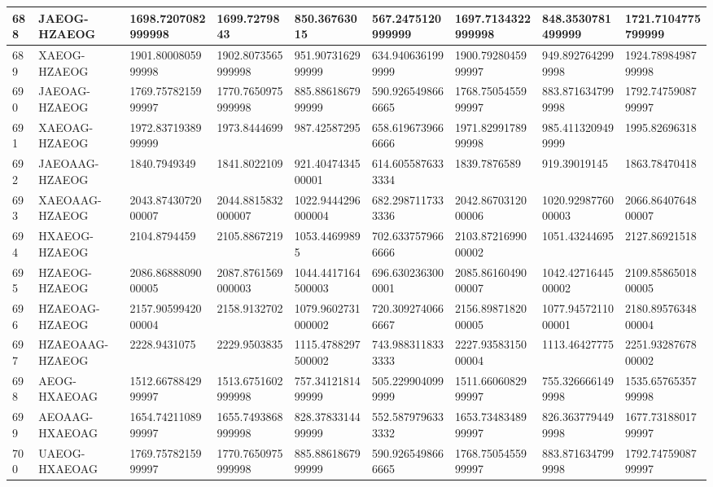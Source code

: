{\begin{longtable}{|l|l|l|l|l|l|l|l|l|}
        688 & JAEOG-HZAEOG & 1698.7207082999998 & 1699.7279843 & 850.36763015 & 567.2475120999999 & 1697.7134322999998 & 848.3530781499999 & 1721.7104775799999 \\ \hline
        689 & XAEOG-HZAEOG & 1901.8000805999998 & 1902.8073565999998 & 951.9073162999999 & 634.9406361999999 & 1900.7928045999997 & 949.8927642999998 & 1924.7898498799998 \\ \hline
        690 & JAEOAG-HZAEOG & 1769.7578215999997 & 1770.7650975999998 & 885.8861867999999 & 590.9265498666665 & 1768.7505455999997 & 883.8716347999998 & 1792.7475908799997 \\ \hline
        691 & XAEOAG-HZAEOG & 1972.8371938999999 & 1973.8444699 & 987.42587295 & 658.6196739666666 & 1971.8299178999998 & 985.4113209499999 & 1995.82696318 \\ \hline
        692 & JAEOAAG-HZAEOG & 1840.7949349 & 1841.8022109 & 921.4047434500001 & 614.6055876333334 & 1839.7876589 & 919.39019145 & 1863.78470418 \\ \hline
        693 & XAEOAAG-HZAEOG & 2043.8743072000007 & 2044.8815832000007 & 1022.9444296000004 & 682.2987117333336 & 2042.8670312000006 & 1020.9298776000003 & 2066.8640764800007 \\ \hline
        694 & HXAEOG-HZAEOG & 2104.8794459 & 2105.8867219 & 1053.44699895 & 702.6337579666666 & 2103.8721699000002 & 1051.43244695 & 2127.86921518 \\ \hline
        695 & HZAEOG-HZAEOG & 2086.8688809000005 & 2087.8761569000003 & 1044.4417164500003 & 696.6302363000001 & 2085.8616049000007 & 1042.4271644500002 & 2109.8586501800005 \\ \hline
        696 & HZAEOAG-HZAEOG & 2157.9059942000004 & 2158.9132702 & 1079.9602731000002 & 720.3092740666667 & 2156.8987182000005 & 1077.9457211000001 & 2180.8957634800004 \\ \hline
        697 & HZAEOAAG-HZAEOG & 2228.9431075 & 2229.9503835 & 1115.4788297500002 & 743.9883118333333 & 2227.9358315000004 & 1113.46427775 & 2251.9328767800002 \\ \hline
        698 & AEOG-HXAEOAG & 1512.6678842999997 & 1513.6751602999998 & 757.3412181499999 & 505.2299040999999 & 1511.6606082999997 & 755.3266661499998 & 1535.6576535799998 \\ \hline
        699 & AEOAAG-HXAEOAG & 1654.7421108999997 & 1655.7493868999998 & 828.3783314499999 & 552.5879796333332 & 1653.7348348999997 & 826.3637794499998 & 1677.7318801799997 \\ \hline
        700 & UAEOG-HXAEOAG & 1769.7578215999997 & 1770.7650975999998 & 885.8861867999999 & 590.9265498666665 & 1768.7505455999997 & 883.8716347999998 & 1792.7475908799997 \\ \hline

\end{longtable}}
